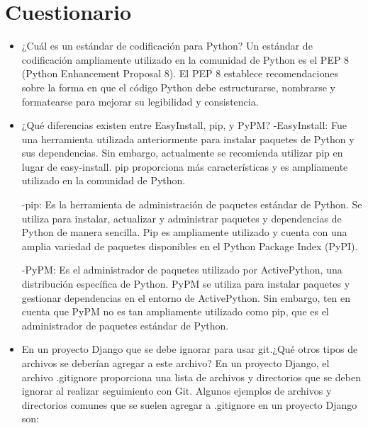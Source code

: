 \documentclass{article}
\begin{document}
    \section{Cuestionario}
    	\begin{itemize}
    		\item ¿Cuál es un estándar de codificación para Python? \newline
     Un estándar de codificación ampliamente utilizado en la comunidad de Python es el PEP 8 (Python Enhancement Proposal 8). El PEP 8 establece recomendaciones sobre la forma en que el código Python debe estructurarse, nombrarse y formatearse para mejorar su legibilidad y consistencia.       
    		\item ¿Qué diferencias existen entre EasyInstall, pip, y PyPM?\newline
      -EasyInstall: Fue una herramienta utilizada anteriormente para instalar paquetes de Python y sus dependencias. Sin embargo, actualmente se recomienda utilizar pip en lugar de easy-install. pip proporciona más características y es ampliamente utilizado en la comunidad de Python.

     -pip: Es la herramienta de administración de paquetes estándar de Python. Se utiliza para instalar, actualizar y administrar paquetes y dependencias de Python de manera sencilla. Pip es ampliamente utilizado y cuenta con una amplia variedad de paquetes disponibles en el Python Package Index (PyPI).

     -PyPM: Es el administrador de paquetes utilizado por ActivePython, una distribución específica de Python. PyPM se utiliza para instalar paquetes y gestionar dependencias en el entorno de ActivePython. Sin embargo, ten en cuenta que PyPM no es tan ampliamente utilizado como pip, que es el administrador de paquetes estándar de Python.
    		\item En un proyecto Django que se debe ignorar para usar git.¿Qué otros tipos de archivos se deberían agregar a este archivo?\newline
      En un proyecto Django, el archivo .gitignore proporciona una lista de archivos y directorios que se deben ignorar al realizar seguimiento con Git. Algunos ejemplos de archivos y directorios comunes que se suelen agregar a .gitignore en un proyecto Django son:
    

\end{itemize}
\end{document}
